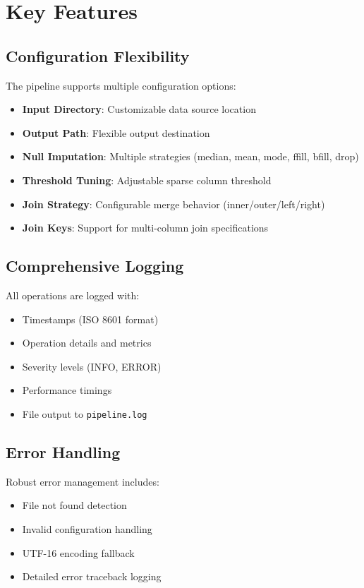 \documentclass[12pt,a4paper]{report}
\begin{document}
\chapter{Key Features}

\section{Configuration Flexibility}

The pipeline supports multiple configuration options:

\begin{itemize}
    \item \textbf{Input Directory}: Customizable data source location
    \item \textbf{Output Path}: Flexible output destination
    \item \textbf{Null Imputation}: Multiple strategies (median, mean, mode, ffill, bfill, drop)
    \item \textbf{Threshold Tuning}: Adjustable sparse column threshold
    \item \textbf{Join Strategy}: Configurable merge behavior (inner/outer/left/right)
    \item \textbf{Join Keys}: Support for multi-column join specifications
\end{itemize}

\section{Comprehensive Logging}

All operations are logged with:
\begin{itemize}
    \item Timestamps (ISO 8601 format)
    \item Operation details and metrics
    \item Severity levels (INFO, ERROR)
    \item Performance timings
    \item File output to \texttt{pipeline.log}
\end{itemize}

\section{Error Handling}

Robust error management includes:
\begin{itemize}
    \item File not found detection
    \item Invalid configuration handling
    \item UTF-16 encoding fallback
    \item Detailed error traceback logging
\end{itemize}
\end{document}

